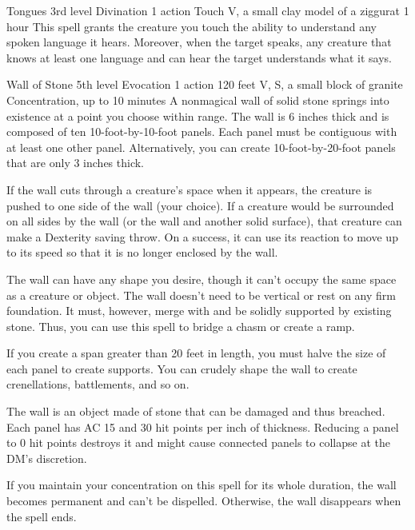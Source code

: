 \documentclass[10pt,a4paper,twoside,bg=print,twocolumn,openany,nodeprecatedcode]{dndbook}
\begin{document}


\DndSpellHeader%
{Tongues}
{3rd level Divination}
{1 action}
{Touch}
{V, a small clay model of a ziggurat}
{1 hour}
This spell grants the creature you touch the ability to understand any spoken language it hears. Moreover, when the target speaks, any creature that knows at least one language and can hear the target understands what it says.



\DndSpellHeader%
{Wall of Stone}
{5th level Evocation}
{1 action}
{120 feet}
{V, S, a small block of granite}
{Concentration, up to 10 minutes}
A nonmagical wall of solid stone springs into existence at a point you choose within range. The wall is 6 inches thick and is composed of ten 10-foot-by-10-foot panels. Each panel must be contiguous with at least one other panel. Alternatively, you can create 10-foot-by-20-foot panels that are only 3 inches thick.

If the wall cuts through a creature's space when it appears, the creature is pushed to one side of the wall (your choice). If a creature would be surrounded on all sides by the wall (or the wall and another solid surface), that creature can make a Dexterity saving throw. On a success, it can use its reaction to move up to its speed so that it is no longer enclosed by the wall.

The wall can have any shape you desire, though it can't occupy the same space as a creature or object. The wall doesn't need to be vertical or rest on any firm foundation. It must, however, merge with and be solidly supported by existing stone. Thus, you can use this spell to bridge a chasm or create a ramp.

If you create a span greater than 20 feet in length, you must halve the size of each panel to create supports. You can crudely shape the wall to create crenellations, battlements, and so on.

The wall is an object made of stone that can be damaged and thus breached. Each panel has AC 15 and 30 hit points per inch of thickness. Reducing a panel to 0 hit points destroys it and might cause connected panels to collapse at the DM's discretion.

If you maintain your concentration on this spell for its whole duration, the wall becomes permanent and can't be dispelled. Otherwise, the wall disappears when the spell ends.

\end{document}
